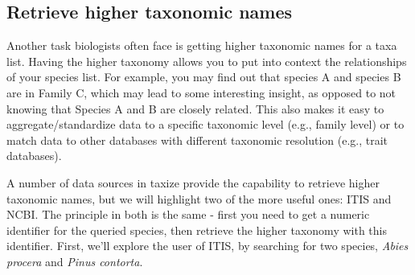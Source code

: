\documentclass[10pt]{article}\usepackage{graphicx, color}
\begin{document}
\subsection*{Retrieve higher taxonomic names}
Another task biologists often face is getting higher taxonomic names for a taxa list. Having the higher taxonomy allows you to put into context the relationships of your species list. For example, you may find out that species A and species B are in Family C, which may lead to some interesting insight, as opposed to not knowing that Species A and B are closely related. This also makes it easy to aggregate/standardize data to a specific taxonomic level (e.g., family level) or to match data to other databases with different taxonomic resolution (e.g., trait databases).

A number of data sources in taxize provide the capability to retrieve higher taxonomic names, but we will highlight two of the more useful ones: ITIS and NCBI. The principle in both is the same - first you need to get a numeric identifier for the queried species, then retrieve the higher taxonomy with this identifier. First, we'll explore the user of ITIS, by searching for two species, \emph{Abies procera} and \emph{Pinus contorta}.
\end{document}
